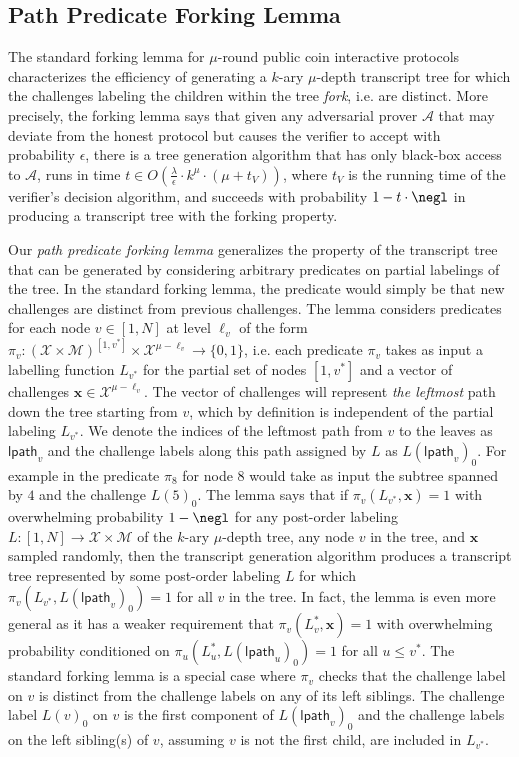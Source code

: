 \documentclass{article}
\theoremstyle{definition}
\begin{document}
\subsection{Path Predicate Forking Lemma}
The standard forking lemma for $\mu$-round public coin interactive protocols characterizes the efficiency of generating a $k$-ary $\mu$-depth transcript tree for which the challenges labeling the children within the tree \emph{fork}, i.e. are distinct. More precisely, the forking lemma says that given any adversarial prover $\mathcal{A}$ that may deviate from the honest protocol but causes the verifier to accept with probability $\epsilon$, there is a tree generation algorithm that has only black-box access to $\mathcal{A}$, runs in time $t \in O(\frac{\lambda}{\epsilon} \cdot k^\mu \cdot (\mu + t_V))$, where $t_V$ is the running time of the verifier's decision algorithm, and succeeds with probability $1 - t \cdot \negl$ in producing a transcript tree with the forking property. 

 Our \emph{path predicate forking lemma} generalizes the property of the transcript tree that can be generated by considering arbitrary predicates on partial labelings of the tree. In the standard forking lemma, the predicate would simply be that new challenges are distinct from previous challenges. The lemma considers predicates for each node $v \in [1,N]$ at level $\ell_v$ of the form $\pi_v: (\mathcal{X}\times \mathcal{M})^{[1,v^*]} \times \mathcal{X}^{\mu - \ell_v} \rightarrow \{0,1\}$, i.e. each predicate $\pi_v$ takes as input a labelling function $L_{v^*}$ for the partial set of nodes $[1,v^*]$ and a vector of challenges $\mathbf{x} \in \mathcal{X}^{\mu - \ell_v}$. 
 The vector of challenges will represent \emph{the leftmost} path down the tree starting from $v$, which by definition is independent of the partial labeling $L_{v^*}$. We denote the indices of the leftmost path from $v$ to the leaves as $\textsf{lpath}_v$ and the challenge labels along this path assigned by $L$ as $L(\textsf{lpath}_v)_0$. For example in  the predicate $\pi_8$ for node $8$ would take as input the subtree spanned by $4$ and the challenge $L(5)_0$. The lemma says that if $\pi_v(L_{v^*}, \mathbf{x}) = 1$ with overwhelming probability $1 - \negl$ for any post-order labeling $L:[1,N] \rightarrow \mathcal{X} \times \mathcal{M}$ of the $k$-ary $\mu$-depth tree, any node $v$ in the tree, and $\mathbf{x}$ sampled randomly, then the transcript generation algorithm produces a transcript tree represented by some post-order labeling $L$ for which $\pi_v(L_{v^*}, L(\textsf{lpath}_v)_0) = 1$ for all $v$ in the tree. In fact, the lemma is even more general as it has a weaker requirement that $\pi_v(L_v^*, \mathbf{x}) = 1$ with overwhelming probability conditioned on $\pi_u(L_u^*, L(\textsf{lpath}_u)_0) = 1$ for all $u \leq v^*$. The standard forking lemma is a special case where $\pi_v$ checks that the challenge label on $v$ is distinct from the challenge labels on any of its left siblings. The challenge label $L(v)_0$ on $v$ is the first component of $L(\textsf{lpath}_v)_0$ and the challenge labels on the left sibling(s) of $v$, assuming $v$ is not the first child, are included in $L_{v^*}$. 
 
\end{document}

